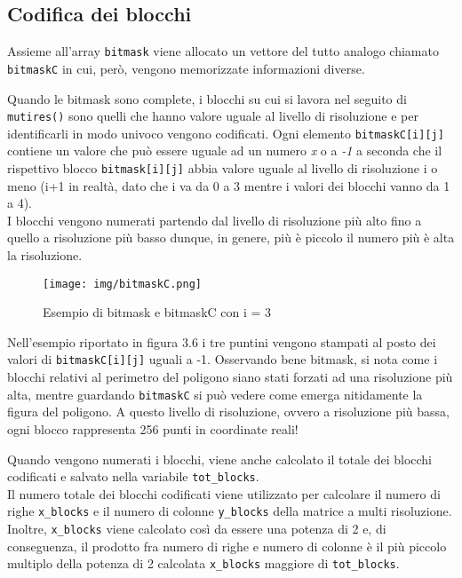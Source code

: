 		\subsection{Codifica dei blocchi} 
			Assieme all'array \texttt{bitmask} viene allocato un vettore del tutto analogo chiamato \texttt{bitmaskC} in cui, per\`{o}, vengono memorizzate informazioni diverse.

			Quando le bitmask sono complete, i blocchi su cui si lavora nel seguito di \texttt{mutires()} sono quelli che hanno valore uguale al livello di risoluzione e per identificarli in modo univoco vengono codificati. Ogni elemento \texttt{bitmaskC[i][j]} contiene un valore che pu\`{o} essere uguale ad un numero \textit{x} o a \textit{-1} a seconda che il rispettivo blocco \texttt{bitmask[i][j]} abbia valore uguale al livello di risoluzione i o meno (i+1 in realt\`{a}, dato che i va da 0 a 3 mentre i valori dei blocchi vanno da 1 a 4). \\
			I blocchi vengono numerati partendo dal livello di risoluzione pi\`{u} alto fino a quello a risoluzione pi\`{u} basso dunque, in genere, pi\`{u} \`{e} piccolo il numero pi\`{u} \`{e} alta la risoluzione.
			\begin{figure}[htbp]
				\centering
				\texttt{[image: img/bitmaskC.png]}
				\caption{Esempio di bitmask e bitmaskC con i = 3}
			\end{figure}
			Nell'esempio riportato in figura 3.6 i tre puntini vengono stampati al posto dei valori di \texttt{bitmaskC[i][j]} uguali a -1. Osservando bene bitmask, si nota come i blocchi relativi al perimetro del poligono siano stati forzati ad una risoluzione pi\`{u} alta, mentre guardando \texttt{bitmaskC} si pu\`{o} vedere come emerga nitidamente la figura del poligono. A questo livello di risoluzione, ovvero a risoluzione pi\`{u} bassa, ogni blocco rappresenta 256 punti in coordinate reali!

			Quando vengono numerati i blocchi, viene anche calcolato il totale dei blocchi codificati e salvato nella variabile \texttt{tot\_blocks}. \\
			Il numero totale dei blocchi codificati viene utilizzato per calcolare il numero di righe \texttt{x\_blocks} e il numero di colonne \texttt{y\_blocks} della matrice a multi risoluzione. Inoltre, \texttt{x\_blocks} viene calcolato cos\`{i} da essere una potenza di 2 e, di conseguenza, il prodotto fra numero di righe e numero di colonne \`{e} il pi\`{u} piccolo multiplo della potenza di 2 calcolata \texttt{x\_blocks} maggiore di \texttt{tot\_blocks}. 

